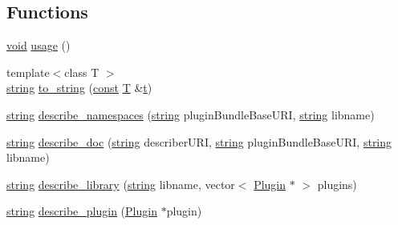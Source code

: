 \subsection*{Functions}
\begin{DoxyCompactItemize}
\item 
\hyperlink{sound_8c_ae35f5844602719cf66324f4de2a658b3}{void} \hyperlink{vamp-rdf-template-generator_8cpp_a2ef30c42cbc289d899a8be5d2d8f77d0}{usage} ()
\item 
{\footnotesize template$<$class T $>$ }\\\hyperlink{test__lib_f_l_a_c_2format_8c_ab02026ad0de9fb6c1b4233deb0a00c75}{string} \hyperlink{vamp-rdf-template-generator_8cpp_a5958fe1f3046eabfc75d689f2117315a}{to\+\_\+string} (\hyperlink{getopt1_8c_a2c212835823e3c54a8ab6d95c652660e}{const} \hyperlink{xmltchar_8h_a16a0f7e7053a679c9bf4289b441a2be7}{T} \&\hyperlink{octave__test_8m_aaccc9105df5383111407fd5b41255e23}{t})
\item 
\hyperlink{test__lib_f_l_a_c_2format_8c_ab02026ad0de9fb6c1b4233deb0a00c75}{string} \hyperlink{vamp-rdf-template-generator_8cpp_a36fd94950a837dfc5c32782723122bb3}{describe\+\_\+namespaces} (\hyperlink{test__lib_f_l_a_c_2format_8c_ab02026ad0de9fb6c1b4233deb0a00c75}{string} plugin\+Bundle\+Base\+U\+RI, \hyperlink{test__lib_f_l_a_c_2format_8c_ab02026ad0de9fb6c1b4233deb0a00c75}{string} libname)
\item 
\hyperlink{test__lib_f_l_a_c_2format_8c_ab02026ad0de9fb6c1b4233deb0a00c75}{string} \hyperlink{vamp-rdf-template-generator_8cpp_a76d5d8f056c4ed5da33622d2235c83d7}{describe\+\_\+doc} (\hyperlink{test__lib_f_l_a_c_2format_8c_ab02026ad0de9fb6c1b4233deb0a00c75}{string} describer\+U\+RI, \hyperlink{test__lib_f_l_a_c_2format_8c_ab02026ad0de9fb6c1b4233deb0a00c75}{string} plugin\+Bundle\+Base\+U\+RI, \hyperlink{test__lib_f_l_a_c_2format_8c_ab02026ad0de9fb6c1b4233deb0a00c75}{string} libname)
\item 
\hyperlink{test__lib_f_l_a_c_2format_8c_ab02026ad0de9fb6c1b4233deb0a00c75}{string} \hyperlink{vamp-rdf-template-generator_8cpp_ae327ecd784dc0b8b57d91128883f8ef7}{describe\+\_\+library} (\hyperlink{test__lib_f_l_a_c_2format_8c_ab02026ad0de9fb6c1b4233deb0a00c75}{string} libname, vector$<$ \hyperlink{class_vamp_1_1_plugin}{Plugin} $\ast$ $>$ plugins)
\item 
\hyperlink{test__lib_f_l_a_c_2format_8c_ab02026ad0de9fb6c1b4233deb0a00c75}{string} \hyperlink{vamp-rdf-template-generator_8cpp_a93935d287b197f6b1a9a225339e61390}{describe\+\_\+plugin} (\hyperlink{class_vamp_1_1_plugin}{Plugin} $\ast$plugin)

\end{DoxyCompactItemize}
